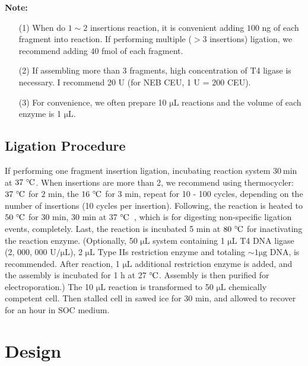 \documentclass[a4paper, twocolumn]{article}
\def\celsius{\ensuremath{^\circ\hspace{-0.09em}\mathrm{C}}}
\begin{document}
\textbf{Note:}
\begin{enumerate}
    \item[(1)] When do $1 \sim 2$ insertions reaction, it is convenient adding $100 $ ng of each fragment into reaction. If performing multiple ($> 3$ insertions) ligation, we recommend adding $40 $ fmol of each fragment.
    \item[(2)] If assembling more than 3 fragments, high concentration of T4 ligase is necessary. I recommend 20 U (for NEB CEU, 1 U = 200 CEU). 
    \item[(3)] For convenience, we often prepare 10 $\mathrm{\mu L}$ reactions and the volume of each enzyme is 1 $\mathrm{\mu L}$.
\end{enumerate}

\subsection{Ligation Procedure}
If performing one fragment insertion ligation, incubating reaction system $30 \ \textrm{min}$ at $37 \ \celsius$. When insertions are more than 2, we recommend using thermocycler: $37\ \celsius$ for $2$ min, the $16 \ \celsius$ for 3 min, repeat for 10 - 100 cycles, depending on the number of insertions (10 cycles per insertion). Following, the reaction is heated to $50 \ \celsius$ for 30 min, 30 min at 37 \celsius \ , which is for digesting non-specific ligation events, completely. Last, the reaction is incubated 5 min at $80 \ \celsius$ for inactivating the reaction enzyme. (Optionally, 50 $\mathrm{\mu L}$ system containing 1 $\mathrm{\mu L}$ T4 DNA ligase (2, 000, 000 $\mathrm{U / \mu L}$), 2 $\mathrm{\mu L}$ Type IIs restriction enzyme and totaling $\sim 1\mathrm{\mu g} $ DNA, is recommended. After reaction, 1 $\mathrm{\mu L}$ additional restriction enzyme is added, and the assembly is incubated for 1 h at 27 \celsius. Assembly is then purified for electroporation.) The 10 $\mathrm{\mu L}$ reaction is transformed to 50 $\mathrm{\mu L}$ chemically competent cell. Then stalled cell in sawed ice for 30 min, and allowed to recover for an hour in SOC medium. 

\section{Design}
\end{document}
